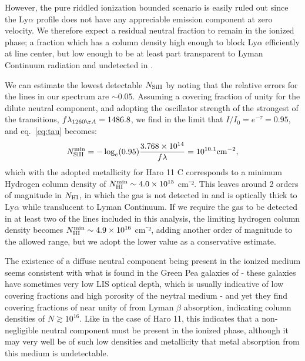 \documentclass[twocolumn]{aastex61}
\begin{document}
However, the pure riddled ionization bounded scenario is easily ruled
out since the Ly$\alpha$ profile does not have any appreciable emission
component at zero velocity. We therefore expect a residual neutral
fraction to remain in the ionized phase; a fraction which has a column
density high enough to block Ly$\alpha$ efficiently at line center, but
low enough to be at least part transparent to Lyman Continuum radiation
and undetected in .

We can estimate the lowest detectable $N_{\rm Si II}$ by noting that the
relative errors for the  lines in our spectrum are
$\sim 0.05$. Assuming a covering fraction of unity for the dilute
neutral component, and adopting the oscillator strength of the strongest
of the  transitions, $f\lambda_{1260 \AA} = 1486.8$, we find
in the limit that $I/I_0 = e^{-\tau} = 0.95$, and eq.~\ref{eq:tau}
becomes:
%
\begin{equation}
\label{eq:silim}
N_{\rm Si II}^{\rm min} = -\log_{e}(0.95) \frac{3.768 \times 10^{14}}{f\lambda} 
    = 10^{10.1} \text{cm}^{-2},
\end{equation}
%
 which with the adopted metallicity for Haro 11 C corresponds to a
minimum Hydrogen column density of
$N_{\rm HI}^{\rm min} \sim 4.0 \times 10^{15}$ cm⁻². This leaves around
2 orders of magnitude in $N_{\rm H I}$, in which the gas is not detected
in  and is optically thick to Ly$\alpha$ while translucent to
Lyman Continuum. If we require the gas to be detected in at least two of
the lines included in this analysis, the limiting hydrogen column
density becomes $N_{\rm HI}^{\rm min} \sim 4.9 \times 10^{16}$ cm⁻²,
adding another order of magnitude to the allowed range, but we adopt the
lower value as a conservative estimate.

The existence of a diffuse neutral component being present in the
ionized medium seems consistent with what is found in the Green Pea
galaxies of \citep{Henry2015} - these galaxies have sometimes very low
LIS optical depth, which is usually indicative of low covering fractions
and high porosity of the neytral medium - and yet they find covering
fractions of near unity of  from Lyman $\beta$ absorption,
indicating column densities of $N \gtrsim 10^{16}$. Like in the case of
Haro 11, this indicates that a non-negligible neutral component must be
present in the ionized phase, although it may very well be of such low
densities and metallicity that metal absorption from this medium is
undetectable.
\end{document}
